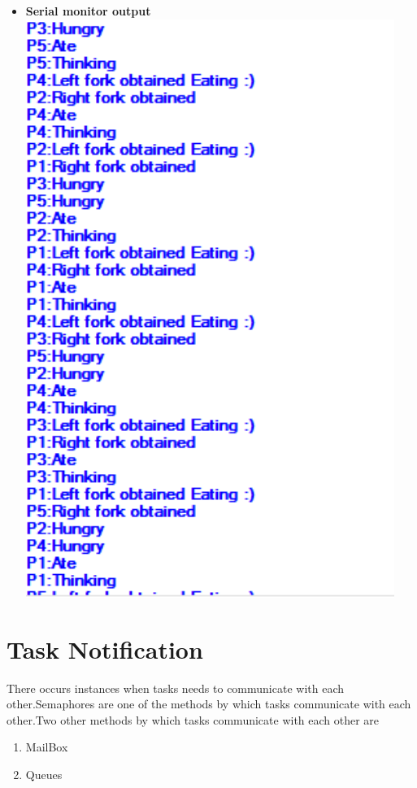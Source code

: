\documentclass[11pt,a4paper]{book}
\begin{document}
\begin{itemize}
	
	\newpage
	\item \textbf{Serial monitor output}
	\\
	\includegraphics[width=12cm]{cont}
\end{itemize}
\newpage


\section{Task Notification}
	There occurs instances when tasks needs to communicate with each other.Semaphores are one of the methods by which tasks communicate with each other.Two other methods by which tasks communicate with each other are 
	\begin{enumerate}
		\item MailBox
		\item Queues
	\end{enumerate}
	
\end{document}
